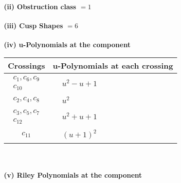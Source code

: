 \documentclass[1p]{elsarticle_modified}
\theoremstyle{definition}
\begin{document}
\flushleft \textbf{(ii) Obstruction class $= 1$}\\~\\
\flushleft \textbf{(iii) Cusp Shapes $= 6$}\\~\\
\newpage\renewcommand{\arraystretch}{1}
\flushleft \textbf{(iv) u-Polynomials at the component}\newline \\
\begin{tabular}{m{50pt}|m{274pt}}
Crossings & \hspace{64pt}u-Polynomials at each crossing \\
\hline $$\begin{aligned}c_{1},c_{6},c_{9}\\c_{10}\end{aligned}$$&$\begin{aligned}
&u^2- u+1
\end{aligned}$\\
\hline $$\begin{aligned}c_{2},c_{4},c_{8}\end{aligned}$$&$\begin{aligned}
&u^2
\end{aligned}$\\
\hline $$\begin{aligned}c_{3},c_{5},c_{7}\\c_{12}\end{aligned}$$&$\begin{aligned}
&u^2+u+1
\end{aligned}$\\
\hline $$\begin{aligned}c_{11}\end{aligned}$$&$\begin{aligned}
&(u+1)^2
\end{aligned}$\\
\hline
\end{tabular}\\~\\
\newpage\renewcommand{\arraystretch}{1}
\flushleft \textbf{(v) Riley Polynomials at the component}\newline \\
\end{document}

